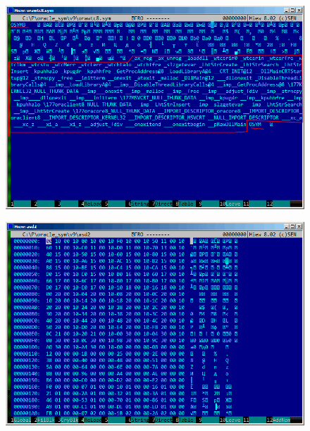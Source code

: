 \begin{figure}[H]
\centering
\includegraphics[scale=\FigScale]{examples/oracle/SYM/whole2.png}
\caption{}
\label{fig:oracle_SYM_whole2}
\end{figure}

\begin{figure}[H]
\centering
\includegraphics[scale=\FigScale]{examples/oracle/SYM/binary1.png}
\caption{}
\label{fig:oracle_SYM_binary1}
\end{figure}

